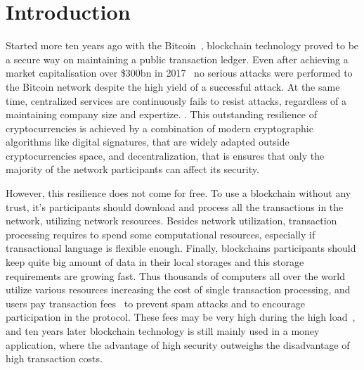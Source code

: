 \section{Introduction}
\label{sec:intro}


Started more ten years ago with the Bitcoin~\cite{nakamoto2008bitcoin}, blockchain technology proved to be a secure way on maintaining
a public transaction ledger.
Even after achieving a market capitalisation over \$300bn in 2017~\cite{btcPrice}
no serious attacks were performed to the Bitcoin network despite the high yield of a successful attack.
At the same time, centralized services are continuously fails to resist attacks, regardless of a maintaining company size and expertize.
.
This outstanding resilience of cryptocurrencies is achieved by a combination of modern cryptographic algorithms like digital
signatures, that are widely adapted outside cryptocurrencies space, and decentralization, that is ensures that only
the majority of the network participants can affect its security.

However, this resilience does not come for free.
To use a blockchain without any trust, it's participants should download and process all the transactions in
the network, utilizing network resources.
Besides network utilization, transaction processing requires to spend some computational resources,
especially if transactional language is flexible enough.
Finally, blockchains participants should keep quite big amount of data in their local storages and
this storage requirements are growing fast.
Thus thousands of computers all over the world utilize various resources
increasing the cost of single transaction processing,
and users pay transaction fees~\cite{chepurnoy2018systematic} to prevent spam attacks and
to encourage participation in the protocol.
These fees may be very high during the high load~\cite{bitcoinFees},
and ten years later blockchain technology is still mainly used in a money application, where the advantage of
high security outweighs the disadvantage of high transaction costs.

